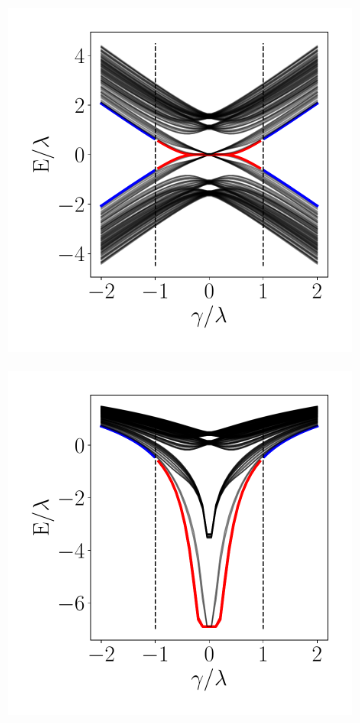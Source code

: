 \begin{figure}[h!]
     \begin{minipage}[h!]{0.9\textwidth}
         \begin{subfigure}[b!]{0.3 \textwidth}
             \caption{}
             \includegraphics[width=\textwidth]{Imagenes/Resultados_Hoti_Fractal/bands_square_shh_0.2.pdf}
             \label{}
         \end{subfigure}\hspace*{-0.5em}
         \begin{subfigure}[b!]{0.3 \textwidth}
             \caption{}
             \includegraphics[width=\textwidth]{Imagenes/Resultados_Hoti_Fractal/bands_square_shh_log0.2.pdf}

\end{subfigure}
\end{minipage}
\end{figure}
